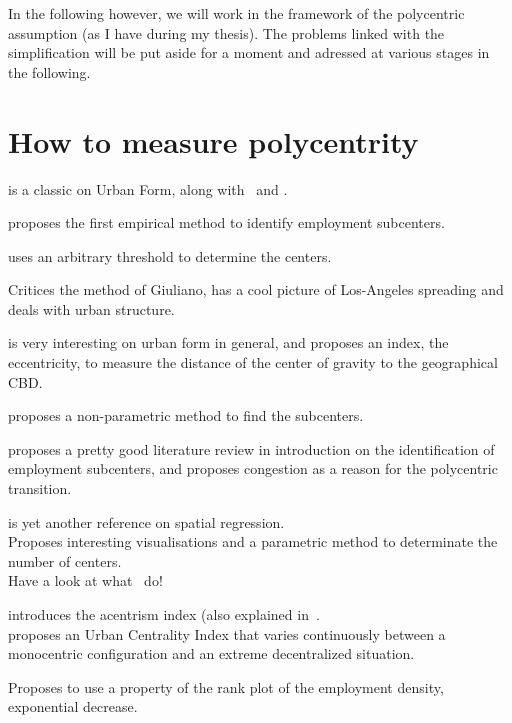 In the following however, we will work in the framework of the polycentric
assumption (as I have during my thesis). The problems linked with the
simplification will be put aside for a moment and adressed at various stages in
the following.


\section{How to measure polycentrity}
\label{sec:how_to_measure_polycentrity}

\cite{Tsai:2005} is a classic on Urban Form, along with~\cite{LeNechet:2015} and
\cite{Schwarz:2010}.

\cite{McDonald:1987} proposes the first empirical method to identify employment
subcenters.

\cite{Giuliano:1991} uses an arbitrary threshold to determine the centers.

\cite{Anas:1998} Critices the method of Giuliano, has a cool picture of
Los-Angeles spreading and deals with urban structure.

\cite{Bertaud:2001} is very interesting on urban form in general, and proposes
an index, the eccentricity, to measure the distance of the center of gravity to
the geographical CBD.


\cite{McMillen:2001} proposes a non-parametric method to find the subcenters.

\cite{McMillen:2003} proposes a pretty good literature review in introduction on
the identification of employment subcenters, and proposes congestion as a reason
for the polycentric transition.


\cite{Griffith:2007} is yet another reference on spatial regression.\\

\cite{Redfearn:2007} Proposes interesting visualisations and a parametric method
to determinate the number of centers.\\

Have a look at what~\cite{Berroir:2008} do!


\cite{LeNechet:2010} introduces the acentrism index (also explained
in~\cite{LeNechet:2015}.\\

\cite{Pereira:2013} proposes an Urban Centrality Index that varies continuously
between a monocentric configuration and an extreme decentralized situation.

\cite{Louf:2013_polycentric} Proposes to use a property of the rank plot of the
employment density, exponential decrease.

